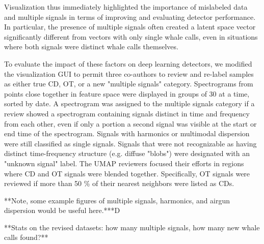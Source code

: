 \documentclass[preprint,NumberedRefs]{JASAnew}
\begin{document}
Visualization thus immediately highlighted the importance of mislabeled data and multiple signals in terms of improving and evaluating detector performance.  In particular, the presence of multiple signals often created a latent space vector significantly different from vectors with only single whale calls, even in situations where both signals were distinct whale calls themselves.

To evaluate the impact of these factors on deep learning detectors, we modified the visualization GUI to permit three co-authors to review and re-label samples as either true CD, OT, or a new "multiple signals" category.  Spectrograms from points close together in feature space were displayed in groups of 30 at a time, sorted by date. A spectrogram was assigned to the multiple signals category if a review showed a spectrogram containing signals distinct in time and frequency from each other, even if only a portion a second signal was visible at the start or end time of the spectrogram.  Signals with harmonics or multimodal dispersion were still classified as single signals.  Signals that were not recognizable as having distinct time-frequency structure (e.g. diffuse "blobs") were designated with an "unknown signal" label.  The UMAP reviewers focused their efforts in regions where CD and OT signals were blended together.  Specifically, OT signals were reviewed if more than 50 \% of their nearest neighbors were listed as CDs.

**Note, some example figures of multiple signals, harmonics, and airgun dispersion would be useful here.***D

**Stats on the revised datasets:  how many multiple signals, how many new whale calls found?** 
\end{document}
